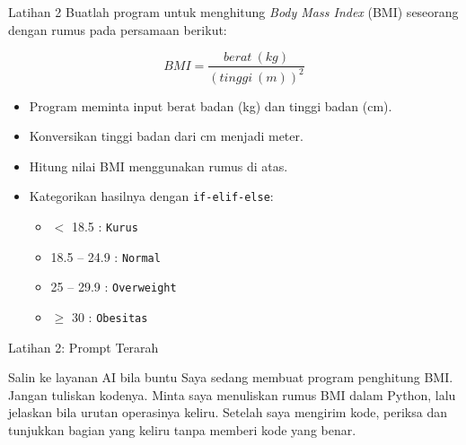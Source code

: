 \documentclass[aspectratio=169, table]{beamer}
\begin{document}
\begin{frame}[fragile,allowframebreaks=0.8]{Latihan 2}
\footnotesize
Buatlah program untuk menghitung \textit{Body Mass Index} (BMI) seseorang dengan rumus pada persamaan berikut:

\begin{equation}
  BMI = \frac{berat \ (kg)}{(tinggi \ (m))^2}
\end{equation}

\begin{itemize}
    \item Program meminta input berat badan (kg) dan tinggi badan (cm).
    \item Konversikan tinggi badan dari cm menjadi meter.
    \item Hitung nilai BMI menggunakan rumus di atas.
    \item Kategorikan hasilnya dengan \texttt{if-elif-else}:
    \begin{itemize}
        \item $<$ 18.5 : \texttt{Kurus}
        \item 18.5 -- 24.9 : \texttt{Normal}
        \item 25 -- 29.9 : \texttt{Overweight}
        \item $\geq$ 30 : \texttt{Obesitas}
    \end{itemize}
\end{itemize}
\end{frame}

\begin{frame}{Latihan 2: Prompt Terarah}
\begin{block}{Salin ke layanan AI bila buntu}
\small Saya sedang membuat program penghitung BMI. Jangan tuliskan kodenya. Minta saya menuliskan rumus BMI dalam Python, lalu jelaskan bila urutan operasinya keliru. Setelah saya mengirim kode, periksa dan tunjukkan bagian yang keliru tanpa memberi kode yang benar.
\end{block}
\end{frame}
\end{document}
